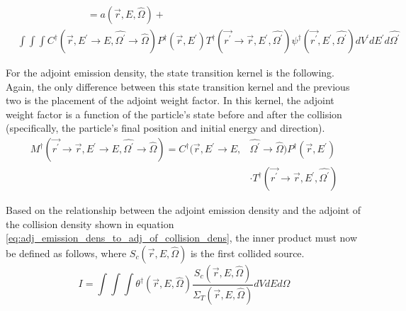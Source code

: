\begin{equation*}
  \begin{split}
    & \qquad \qquad \qquad \quad = a(\vec{r},E,\hat{\Omega}) + \\
    & \int\int\int 
    C^{\dagger}(\vec{r},E^{'} \to E,\hat{\Omega^{'}} \to \hat{\Omega})
    P^{\dagger}(\vec{r},E^{'})
    T^{\dagger}(\vec{r^{'}} \to \vec{r},E^{'},\hat{\Omega^{'}})
    \psi^{\dagger}(\vec{r^{'}},E^{'},\hat{\Omega^{'}}) dV^{'}dE^{'}d\hat{\Omega^{'}}
  \end{split}
\end{equation*}

For the adjoint emission density, the state transition kernel is the following.
Again, the only difference between this state transition kernel and the 
previous two is the placement of the adjoint weight factor. In this kernel,
the adjoint weight factor is a function of the particle's state before and
after the collision (specifically, the particle's final position and initial
energy and direction).
\begin{equation}
  \begin{split}
    M^{\dagger}(\vec{r^{'}} \to \vec{r},E^{'} \to E,\hat{\Omega^{'}} \to \hat{\Omega})
    = C^{\dagger}(\vec{r},E^{'} \to E,&\hat{\Omega^{'}} \to \hat{\Omega})
    P^{\dagger}(\vec{r},E^{'})  \\
    & \cdot T^{\dagger}(\vec{r^{'}} \to \vec{r},E^{'},\hat{\Omega^{'}}) 
  \end{split}
\end{equation}

Based on the relationship between the adjoint emission density and the adjoint
of the collision density shown in equation 
\ref{eq:adj_emission_dens_to_adj_of_collision_dens}, the inner product must now
be defined as follows, where $S_c(\vec{r},E,\hat{\Omega})$ is the first
collided source.
\begin{equation}
  I = \int\int\int \theta^{\dagger}(\vec{r},E,\hat{\Omega})
  \frac{S_c(\vec{r},E,\hat{\Omega})}{\Sigma_T(\vec{r},E,\hat{\Omega})}
  dV dE d\hat{\Omega}
\end{equation}
